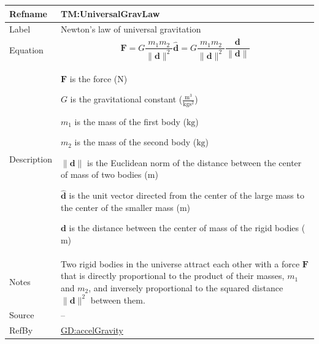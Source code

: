 \documentclass[12pt]{article}
\begin{document}
\medskip
\noindent
\begin{minipage}{\textwidth}
\begin{tabular}{>{\raggedright}p{}>{\raggedright\arraybackslash}p{}}
\toprule \textbf{Refname} & \textbf{TM:UniversalGravLaw}
\label{TM:UniversalGravLaw}
\\ \midrule
Label & Newton's law of universal gravitation
        
\\ \midrule
Equation & \begin{displaymath}
           \symbf{F}=G \frac{{m_{1}} {m_{2}}}{\|\symbf{d}\|^{2}} \symbf{\hat{d}}=G \frac{{m_{1}} {m_{2}}}{\|\symbf{d}\|^{2}} \frac{\symbf{d}}{\|\symbf{d}\|}
           \end{displaymath}
\\ \midrule
Description & \begin{symbDescription}
              \item{$\symbf{F}$ is the force (${\text{N}}$)}
              \item{$G$ is the gravitational constant ($\frac{\text{m}^{3}}{\text{kg}\text{s}^{2}}$)}
              \item{${m_{1}}$ is the mass of the first body (${\text{kg}}$)}
              \item{${m_{2}}$ is the mass of the second body (${\text{kg}}$)}
              \item{$\|\symbf{d}\|$ is the Euclidean norm of the distance between the center of mass of two bodies (${\text{m}}$)}
              \item{$\symbf{\hat{d}}$ is the unit vector directed from the center of the large mass to the center of the smaller mass (${\text{m}}$)}
              \item{$\symbf{d}$ is the distance between the center of mass of the rigid bodies (${\text{m}}$)}
              \end{symbDescription}
\\ \midrule
Notes & Two rigid bodies in the universe attract each other with a force $\symbf{F}$ that is directly proportional to the product of their masses, ${m_{1}}$ and ${m_{2}}$, and inversely proportional to the squared distance ${\|\symbf{d}\|^{2}}$ between them.
        
\\ \midrule
Source & --
         
\\ \midrule
RefBy & \hyperref[GD:accelGravity]{GD:accelGravity}
        
\\ \bottomrule
\end{tabular}
\end{minipage}
\end{document}
